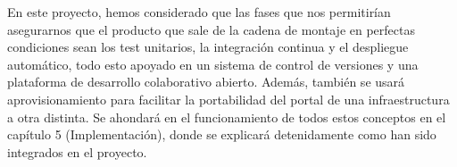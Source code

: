 \bigskip
En este proyecto, hemos considerado que las fases que nos permitirían asegurarnos que el producto que sale de la cadena de 
montaje en perfectas condiciones sean los test unitarios, la integración continua y el despliegue automático, todo esto apoyado
en un sistema de control de versiones y una plataforma de desarrollo colaborativo abierto. Además, también se usará
aprovisionamiento para facilitar la portabilidad del portal de una infraestructura a otra distinta. Se ahondará en el 
funcionamiento de todos estos conceptos en el capítulo 5 (Implementación), donde se explicará detenidamente como han sido 
integrados en el proyecto.